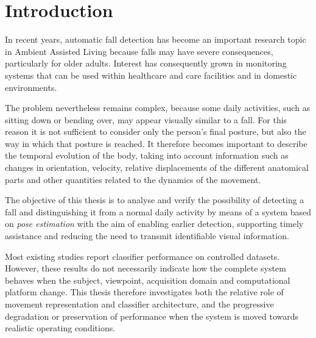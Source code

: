 \chapter*{Introduction}
\setcounter{chapter}{0}

In recent years, automatic fall detection has become an important research topic in Ambient Assisted Living because falls may have severe consequences, particularly for older adults. Interest has consequently grown in monitoring systems that can be used within healthcare and care
facilities and in domestic environments.

The problem nevertheless remains complex, because some daily activities, such
as sitting down or bending over, may appear visually similar to a fall.
For this reason it is not sufficient to consider only the person's final
posture, but also the way in which that posture is reached. It therefore
becomes important to describe the temporal evolution of the body, taking into
account information such as changes in orientation, velocity, relative
displacements of the different anatomical parts and other quantities related
to the dynamics of the movement.

The objective of this thesis is to analyse and verify the possibility of
detecting a fall and distinguishing it from a normal daily activity by means
of a system based on \emph{pose estimation} with the aim of enabling earlier detection, supporting timely assistance and reducing the need to transmit identifiable visual information.

Most existing studies report classifier performance on controlled datasets. However, these results do not necessarily indicate how the complete system behaves when the subject, viewpoint, acquisition domain and computational platform change. This thesis therefore investigates both the relative role of movement representation and classifier architecture, and the progressive
degradation or preservation of performance when the system is moved towards realistic operating conditions.

